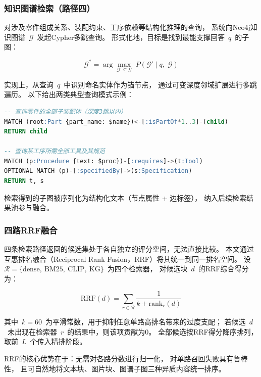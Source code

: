 \subsubsection{知识图谱检索（路径四）}
\label{sec:kg-retrieval}

对涉及零件组成关系、装配约束、工序依赖等结构化推理的查询，
系统向Neo4j知识图谱~$\mathcal{G}$~发起Cypher多跳查询。
形式化地，目标是找到最能支撑回答~$q$~的子图：

\begin{equation}
  \mathcal{G}^{*}
  = \arg\max_{\mathcal{G}' \subseteq \mathcal{G}}\;
    P\!\left(\mathcal{G}' \mid q,\; \mathcal{G}\right)
  \label{eq:kg-retrieval}
\end{equation}

实现上，从查询~$q$~中识别命名实体作为锚节点，
通过可变深度邻域扩展进行多跳遍历。
以下给出两类典型查询模式示例：

\begin{lstlisting}[language=SQL, caption={Cypher多跳查询示例}]
-- 查询零件的全部子装配体（深度3跳以内）
MATCH (root:Part {part_name: $name})<-[:isPartOf*1..3]-(child)
RETURN child

-- 查询某工序所需全部工具及其规范
MATCH (p:Procedure {text: $proc})-[:requires]->(t:Tool)
OPTIONAL MATCH (p)-[:specifiedBy]->(s:Specification)
RETURN t, s
\end{lstlisting}

检索得到的子图被序列化为结构化文本（节点属性 + 边标签），
纳入后续检索结果池参与融合。

\subsubsection{四路RRF融合}
\label{sec:rrf}

四条检索路径返回的候选集处于各自独立的评分空间，无法直接比较。
本文通过互惠排名融合（Reciprocal Rank Fusion，RRF）将其统一到同一排名空间。
设~$\mathcal{R} = \{\text{dense},\ \text{BM25},\ \text{CLIP},\ \text{KG}\}$~为四个检索器，
对候选块~$d$~的RRF综合得分为：

\begin{equation}
  \text{RRF}(d)
  = \sum_{r \in \mathcal{R}} \frac{1}{k + \text{rank}_r(d)}
  \label{eq:rrf}
\end{equation}

其中~$k = 60$~为平滑常数，用于抑制任意单路高排名带来的过度支配；
若候选~$d$~未出现在检索器~$r$~的结果中，则该项贡献为0。
全部候选按RRF得分降序排列，取前~$L$~个传入精排阶段。

RRF的核心优势在于：无需对各路分数进行归一化，
对单路召回失败具有鲁棒性，
且可自然地将文本块、图片块、图谱子图三种异质内容统一排序。

